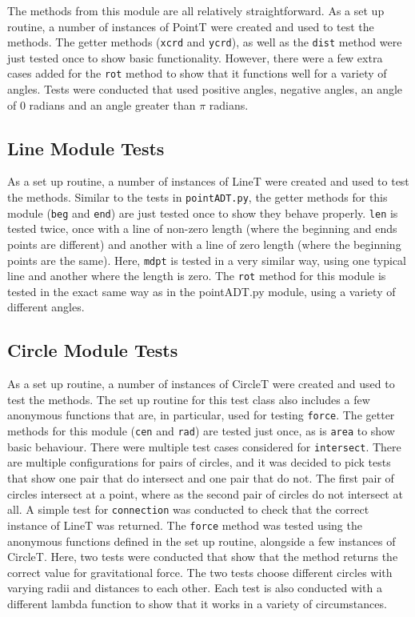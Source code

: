 \documentclass[12pt]{article}
\begin{document}
The methods from this module are all relatively straightforward. As a set up routine, a number of instances of PointT were created and used to test the methods. The getter methods ({\tt xcrd} and {\tt ycrd}), as well as the {\tt dist} method were just tested once to show basic functionality. However, there were a few extra cases added for the {\tt rot} method to show that it functions well for a variety of angles. Tests were conducted that used positive angles, negative angles, an angle of 0 radians and an angle greater than $\pi$ radians.

\subsection{Line Module Tests}

As a set up routine, a number of instances of LineT were created and used to test the methods. Similar to the tests in {\tt pointADT.py}, the getter methods for this module ({\tt beg} and {\tt end}) are just tested once to show they behave properly. {\tt len} is tested twice, once with a line of non-zero length (where the beginning and ends points are different) and another with a line of zero length (where the beginning points are the same). Here, {\tt mdpt} is tested in a very similar way, using one typical line and another where the length is zero. The {\tt rot} method for this module is tested in the exact same way as in the {pointADT.py} module, using a variety of different angles.

\subsection{Circle Module Tests}

As a set up routine, a number of instances of CircleT were created and used to test the methods. The set up routine for this test class also includes a few anonymous functions that are, in particular, used for testing {\tt force}. The getter methods for this module ({\tt cen} and {\tt rad}) are tested just once, as is {\tt area} to show basic behaviour. There were multiple test cases considered for {\tt intersect}. There are multiple configurations for pairs of circles, and it was decided to pick tests that show one pair that do intersect and one pair that do not. The first pair of circles intersect at a point, where as the second pair of circles do not intersect at all. A simple test for {\tt connection} was conducted to check that the correct instance of LineT was returned. The {\tt force} method was tested using the anonymous functions defined in the set up routine, alongside a few instances of CircleT. Here, two tests were conducted that show that the method returns the correct value for gravitational force. The two tests choose different circles with varying radii and distances to each other. Each test is also conducted with a different lambda function to show that it works in a variety of circumstances. 
\end{document}
